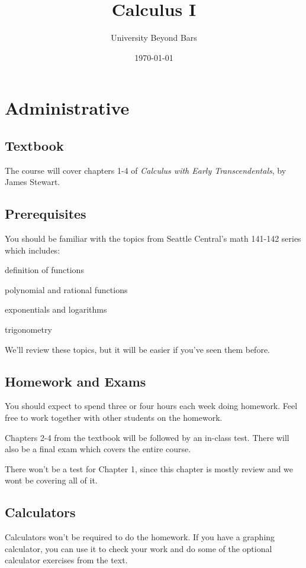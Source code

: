 \documentclass[fleqn, onecolumn]{article}
\title{Calculus I}
\author{University Beyond Bars}
\date{\today}
\begin{document}
  \maketitle

  \section{Administrative}
  \subsection{Textbook}
  The course will cover chapters 1-4 of {\em Calculus with Early
  Transcendentals}, by James Stewart.  

  \subsection{Prerequisites}
  You should be familiar with the topics from Seattle Central's math 141-142 series
  which includes:
  \begin{itemize*}
    \item definition of functions
    \item polynomial and rational functions
    \item exponentials and logarithms
    \item trigonometry
  \end{itemize*}

  We'll review these topics, but it will be easier if you've seen them before.

  \subsection{Homework and Exams}

  You should expect to spend three or four hours each week doing homework.  Feel
  free to work together with other students on the homework.

  Chapters 2-4 from the textbook will be followed by an in-class test.  There
  will also be a final exam which covers the entire course.

  There won't be a test for Chapter 1, since this chapter is mostly review and
  we wont be covering all of it.

  \subsection{Calculators}
  Calculators won't be required to do the homework. If you have a graphing
  calculator, you can use it to check your work and do some of the optional
  calculator exercises from the text.
\end{document}
